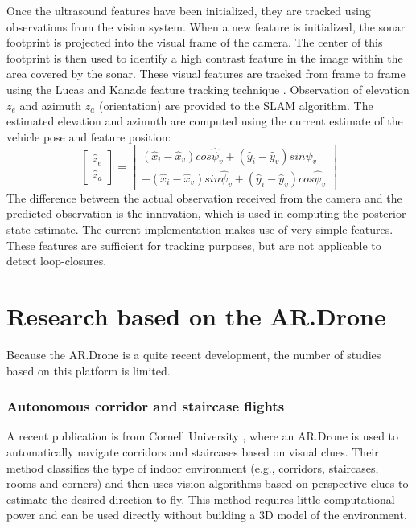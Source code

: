 Once the ultrasound features have been initialized, they are tracked using observations from the vision system.
When a new feature is initialized, the sonar footprint is projected into the visual frame of the camera.
The center of this footprint is then used to identify a high contrast feature in the image within the area covered by the sonar.
These visual features are tracked from frame to frame using the Lucas and Kanade feature tracking technique \cite{lucas1998application}.
Observation of elevation $z_e$ and azimuth $z_a$ (orientation) are provided to the SLAM algorithm.
The estimated elevation and azimuth are computed using the current estimate of the vehicle pose and feature position:
\begin{equation}
\left[ {
\begin{array}{c} \hat{z}_e \\ \hat{z}_a \end{array}
} \right] =
\left[ {
\begin{array}{c}
	(\hat{x}_i - \hat{x}_v) cos \hat{\psi}_v + (\hat{y}_i - \hat{y}_v) sin \hat{\psi}_v \\
	-(\hat{x}_i - \hat{x}_v) sin \hat{\psi}_v + (\hat{y}_i - \hat{y}_v) cos \hat{\psi}_v
\end{array}
} \right]
\end{equation}
The difference between the actual observation received from the camera and the predicted observation is the innovation, which is used in computing the posterior state estimate.
The current implementation makes use of very simple features.
These features are sufficient for tracking purposes, but are not applicable to detect loop-closures.


\section{Research based on the AR.Drone}
Because the AR.Drone is a quite recent development, the number of studies based on this platform is limited.

\subsubsection{Autonomous corridor and staircase flights}

A recent publication is from Cornell University \cite{Bills2011icra}, where an AR.Drone is used to automatically navigate corridors and staircases based on visual clues.
Their method classifies the type of indoor environment (e.g., corridors, staircases, rooms and corners) and then uses vision algorithms based on perspective clues to estimate the desired direction to fly.
This method requires little computational power and can be used directly without building a 3D model of the environment.

